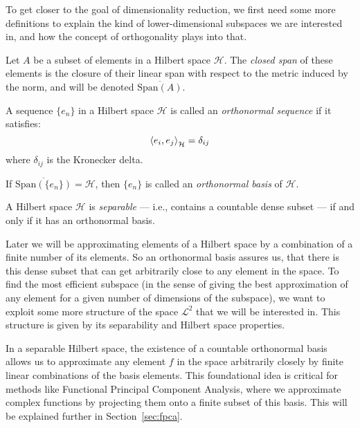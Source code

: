 To get closer to the goal of dimensionality reduction, we first need some more definitions
to explain the kind of lower-dimensional subspaces we are interested in, and how the
concept of orthogonality plays into that. 
\begin{definition}
    \label{def:closed span}
    Let \( A \) be a subset of elements in a Hilbert
    space \( \mathcal{H} \). The \textit{closed span} of these
    elements is the closure of their linear span with respect to the metric induced by the
    norm, and will be denoted $\overline{\text{Span}(A)}$.
\end{definition}
\begin{definition}
    \label{def:orthonormal sequence}
    A sequence \( \{ e_n \} \) in a Hilbert space \( \mathcal{H} \) is called an
    \textit{orthonormal sequence} if it satisfies:
    \[
    \left \langle e_i, e_j \right \rangle_\mathcal{H} = \delta_{ij}
    \]
    where \( \delta_{ij} \) is the Kronecker delta.

    If $\overline{\text{Span}(\{ e_n \})} =  \mathcal{H}$, then $\{ e_n \}$ is called an
    \textit{orthonormal basis} of $\mathcal{H}$.
\end{definition}
\begin{theorem}
    \label{thm:separability-orthonormal-basis}
    A Hilbert space \( \mathcal{H} \) is \textit{separable} --- i.e., contains a countable dense 
    subset --- if and only if it has an orthonormal basis.
\end{theorem}
Later we will be approximating elements of a Hilbert space by a combination of a finite
number of its elements. So an orthonormal basis assures us, that there is this dense
subset that can get arbitrarily close to any element in the space. To find the most
efficient subspace (in the sense of giving the best approximation of any element for a
given number of dimensions of the subspace), we want to exploit some more structure of
the space $\mathcal{L}^2$ that we will be interested in. This structure
is given by its separability and Hilbert space properties.

In a separable Hilbert space, the existence of a countable orthonormal basis allows us to 
approximate any element \( f \) in the space arbitrarily closely by finite linear combinations 
of the basis elements. This foundational idea is critical for methods like Functional Principal 
Component Analysis, where we approximate complex functions by projecting them onto a finite 
subset of this basis. This will be explained further in Section~\ref{sec:fpca}.


